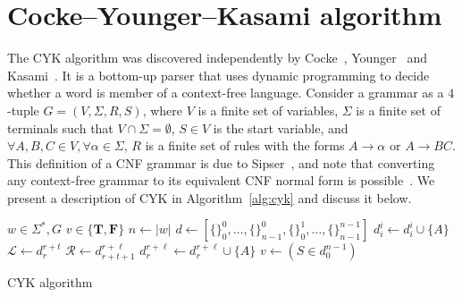 \documentclass[12pt]{article}
\begin{document}
\section{Cocke–Younger–Kasami algorithm}\label{sec:cyk}

The CYK algorithm was discovered independently by Cocke~\cite{}, Younger~\cite{} and Kasami~\cite{}. It is a bottom-up parser that uses dynamic programming to decide whether a word is member of a context-free language. Consider a grammar as a $4$-tuple $G = (V, \Sigma, R, S)$, where $V$ is a finite set of variables, $\Sigma$ is a finite set of terminals such that $V \cap \Sigma = \emptyset$, $S \in V$ is the start variable, and $\forall A, B, C \in V, \forall \alpha \in \Sigma$, $R$ is a finite set of rules with the forms $A \rightarrow \alpha$ or $A \rightarrow BC$. This definition of a CNF grammar is due to Sipser~\cite{}, and note that converting any context-free grammar to its equivalent CNF normal form is possible~\cite{}. We present a description of CYK in Algorithm~\ref{alg:cyk} and discuss it below.

\begin{algorithm}[ht]
  \begin{algorithmic}[1]
    \REQUIRE{} $w \in \Sigma^{*}, G$
    \ENSURE{} $v \in \{\mathbf{T}, \mathbf{F}\}$
    \STATE{} $n \leftarrow |w|$
    \STATE{} $d \leftarrow [\{\}_{0}^{0}, \dots, \{\}_{n - 1}^{0}, \{\}_{0}^{1}, \dots, \{\}_{n - 1}^{n - 1}]$
        \STATE{} $d_{i}^{i} \leftarrow d_{i}^{i} \cup \{A\}$
      \ENDIF{}
    \ENDFOR{}
          \STATE{} $\mathcal{L} \leftarrow d_{r}^{r + t}$
          \STATE{} $\mathcal{R} \leftarrow d_{r + t + 1}^{r + \ell}$
              \STATE{} $d_{r}^{r + \ell} \leftarrow d_{r}^{r + \ell} \cup \{A\}$
            \ENDIF{}
          \ENDFOR{}
        \ENDFOR{}
      \ENDFOR{}
    \ENDFOR{}
    \STATE{} $v \leftarrow (S \in d_{0}^{n - 1})$
  \end{algorithmic}
  \caption{CYK algorithm}\label{alg:cyk}
\end{algorithm}
\end{document}
